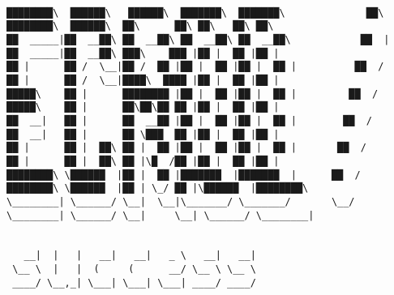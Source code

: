 \documentclass[varwidth=\maxdimen,margin=0.5cm,multi={verbatim}]{standalone}
\begin{document}
\begin{verbatim}

████████\  ██████\   ██████\  ███████\  ███████\              ██\       ████████\  ██████\  ██\      ██\ ██\   ██\ ██\
██  _____|██  __██\ ██  __██\ ██  __██\ ██  __██\            ██  |      ██  _____|██  __██\ ███\    ███ |██ |  ██ |██ |
██ |      ██ /  \__|██ /  ██ |██ |  ██ |██ |  ██ |          ██  /       ██ |      ██ /  \__|████\  ████ |██ |  ██ |██ |
█████\    ██ |      ████████ |██ |  ██ |██ |  ██ |         ██  /        █████\    ██ |      ██\██\██ ██ |██ |  ██ |██ |
██  __|   ██ |      ██  __██ |██ |  ██ |██ |  ██ |        ██  /         ██  __|   ██ |      ██ \███  ██ |██ |  ██ |██ |
██ |      ██ |  ██\ ██ |  ██ |██ |  ██ |██ |  ██ |       ██  /          ██ |      ██ |  ██\ ██ |\█  /██ |██ |  ██ |██ |
████████\ \██████  |██ |  ██ |███████  |███████  |      ██  /           ████████\ \██████  |██ | \_/ ██ |\██████  |████████\
\________| \______/ \__|  \__|\_______/ \_______/       \__/            \________| \______/ \__|     \__| \______/ \________|

                                                                      
   __|  |   |   __|   __|   _ \   __|   __|
 \__ \  |   |  (     (      __/ \__ \ \__ \
 ____/ \__,_| \___| \___| \___| ____/ ____/



\end{verbatim}
\end{document}
